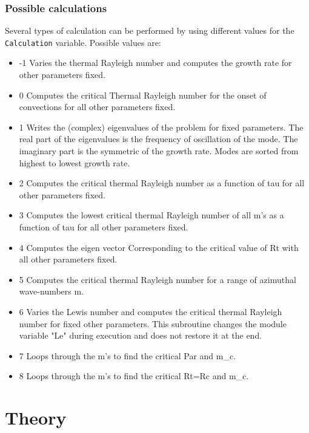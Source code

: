 \documentclass[a4paper,10pt]{book}
\begin{document}
\subsection{Possible calculations}
\label{s:possibleCalcs}
Several types of calculation can be performed by using different values for the 
\verb|Calculation| variable. Possible values are:
\begin{itemize}
\item{-1} Varies the thermal Rayleigh number and computes the growth rate for other parameters fixed.
\item{0} Computes the critical Thermal Rayleigh number for the onset of convections for all other parameters fixed.
\item{1} Writes the (complex) eigenvalues of the problem for fixed parameters. The real part of the eigenvalues is the frequency of oscillation of the mode. The imaginary part is the symmetric of the growth rate. Modes are sorted from highest to lowest growth rate.
\item{2} Computes the critical thermal Rayleigh number as a function of tau for all other parameters fixed.
\item{3} Computes the lowest critical thermal Rayleigh number of all m's as a function of tau for all other parameters fixed.
\item{4} Computes the eigen vector Corresponding to the critical value of Rt with all other parameters fixed.
\item{5} Computes the critical thermal Rayleigh number for a range of azimuthal wave-numbers m.
\item{6} Varies the Lewis number and computes the critical thermal Rayleigh number for fixed other parameters. This subroutine changes the module variable "Le" during execution and does not restore it at the end.
\item{7} Loops through the m's to find the critical Par and m\_c.
\item{8} Loops through the m's to find the critical Rt=Rc and m\_c. 
\end{itemize}


\chapter{Theory}
\end{document}
